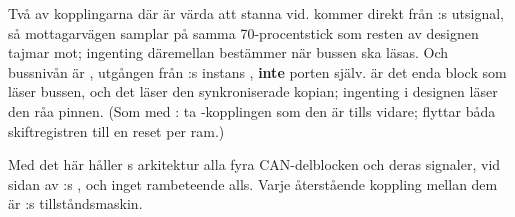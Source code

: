 Två av kopplingarna där är värda att stanna vid.  kommer direkt från :s
utsignal, så mottagarvägen samplar på samma 70-procentstick som resten av designen tajmar mot;
ingenting däremellan bestämmer när bussen ska läsas. Och bussnivån är , utgången från
:s instans , \textbf{inte} porten  själv.
 är det enda block som läser bussen, och det läser den synkroniserade kopian;
ingenting i designen läser den råa pinnen. (Som med : ta
-kopplingen som den är tills vidare;  flyttar båda skiftregistren
till en reset per ram.)

Med det här håller s arkitektur alla fyra CAN-delblocken och deras signaler, vid
sidan av :s , och inget rambeteende alls. Varje återstående koppling
mellan dem är :s tillståndsmaskin.
